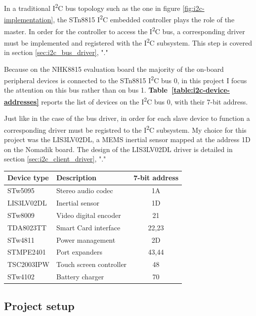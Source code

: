 \documentclass[a4paper,10pt]{article}
\makeatletter
\newenvironment{tablehere}{\def\@captype{table}}{}
\newcommand{\iic}{I\textsuperscript{2}C }
\newcommand{\reft}[1]{\textbf{Table~\ref{#1}}}
\makeatother
\begin{document}
\begin{multicols}{2}
In a traditional \iic bus topology such as the one in figure
\ref{fig:i2c-implementation}, the STn8815 \iic embedded controller plays the
role of the master. In order for the controller to access the \iic bus, a
corresponding driver must be implemented and registered with the \iic
subsystem. This step is covered in section \ref{sec:i2c_bus_driver},
"."

Because on the NHK8815 evaluation board the majority of the on-board peripheral
devices is connected to the STn8815 \iic bus 0, in this project I focus the
attention on this bus rather than on bus 1.
\reft{table:i2c-device-addresses} reports the list of devices on 
the \iic bus 0, with their 7-bit address.

Just like in the case of the bus driver, in order for each slave device
to function a corresponding driver must be registred to the \iic subsystem.
My choice for this project was the LIS3LV02DL, a MEMS inertial sensor mapped
at the address 1D on the Nomadik board.
The design of the LIS3LV02DL driver is detailed in section
\ref{sec:i2c_client_driver}, "."\\[6pt]

\begin{tablehere}
	\centering
	\renewcommand{\arraystretch}{1.2}	
	\begin{tabular}{l l c}
		\hline
		Device type & Description & 7-bit address \\
		\hline
		STw5095 & Stereo audio codec & 1A \\
		LIS3LV02DL & Inertial sensor & 1D \\
		STw8009 & Video digital encoder	 & 21 \\
		TDA8023TT & Smart Card interface & 22,23 \\
		STw4811 & Power management & 2D \\
		STMPE2401 & Port expanders & 43,44 \\
		TSC2003IPW & Touch screen controller & 48 \\
		STw4102 & Battery charger & 70 \\
		\hline
	\end{tabular}
	\caption{Device address map of NHK8815 \iic bus 0.}
	\label{table:i2c-device-addresses}
\end{tablehere}



\subsection{Project setup}
\label{sec:project_setup}


\end{multicols}
\end{document}
